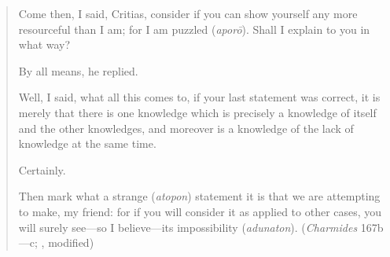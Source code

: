 \begin{quotation}
	Come then, I said, Critias, consider if you can show yourself any more resourceful than I am; for I am puzzled (\emph{aporō}). Shall I explain to you in what way?
	
	By all means, he replied.
	
	Well, I said, what all this comes to, if your last statement was correct, it is merely that there is one knowledge which is precisely a knowledge of itself and the other knowledges, and moreover is a knowledge of the lack of knowledge at the same time.
	
	Certainly.
	
	Then mark what a strange (\emph{atopon}) statement it is that we are attempting to make, my friend: for if you will consider it as applied to other cases, you will surely see—so I believe—its impossibility (\emph{adunaton}). (\emph{Charmides} 167b—c; \citealt[57]{Lamb:1927qw}, modified)
\end{quotation}

